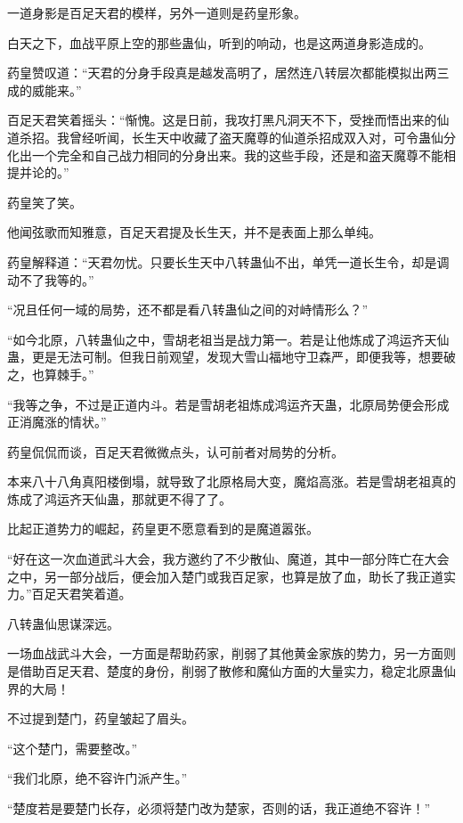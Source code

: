 \begin{this_body}
一道身影是百足天君的模样，另外一道则是药皇形象。

白天之下，血战平原上空的那些蛊仙，听到的响动，也是这两道身影造成的。

药皇赞叹道：“天君的分身手段真是越发高明了，居然连八转层次都能模拟出两三成的威能来。”

百足天君笑着摇头：“惭愧。这是日前，我攻打黑凡洞天不下，受挫而悟出来的仙道杀招。我曾经听闻，长生天中收藏了盗天魔尊的仙道杀招成双入对，可令蛊仙分化出一个完全和自己战力相同的分身出来。我的这些手段，还是和盗天魔尊不能相提并论的。”

药皇笑了笑。

他闻弦歌而知雅意，百足天君提及长生天，并不是表面上那么单纯。

药皇解释道：“天君勿忧。只要长生天中八转蛊仙不出，单凭一道长生令，却是调动不了我等的。”

“况且任何一域的局势，还不都是看八转蛊仙之间的对峙情形么？”

“如今北原，八转蛊仙之中，雪胡老祖当是战力第一。若是让他炼成了鸿运齐天仙蛊，更是无法可制。但我日前观望，发现大雪山福地守卫森严，即便我等，想要破之，也算棘手。”

“我等之争，不过是正道内斗。若是雪胡老祖炼成鸿运齐天蛊，北原局势便会形成正消魔涨的情状。”

药皇侃侃而谈，百足天君微微点头，认可前者对局势的分析。

本来八十八角真阳楼倒塌，就导致了北原格局大变，魔焰高涨。若是雪胡老祖真的炼成了鸿运齐天仙蛊，那就更不得了了。

比起正道势力的崛起，药皇更不愿意看到的是魔道嚣张。

“好在这一次血道武斗大会，我方邀约了不少散仙、魔道，其中一部分阵亡在大会之中，另一部分战后，便会加入楚门或我百足家，也算是放了血，助长了我正道实力。”百足天君笑着道。

八转蛊仙思谋深远。

一场血战武斗大会，一方面是帮助药家，削弱了其他黄金家族的势力，另一方面则是借助百足天君、楚度的身份，削弱了散修和魔仙方面的大量实力，稳定北原蛊仙界的大局！

不过提到楚门，药皇皱起了眉头。

“这个楚门，需要整改。”

“我们北原，绝不容许门派产生。”

“楚度若是要楚门长存，必须将楚门改为楚家，否则的话，我正道绝不容许！”

\end{this_body}

